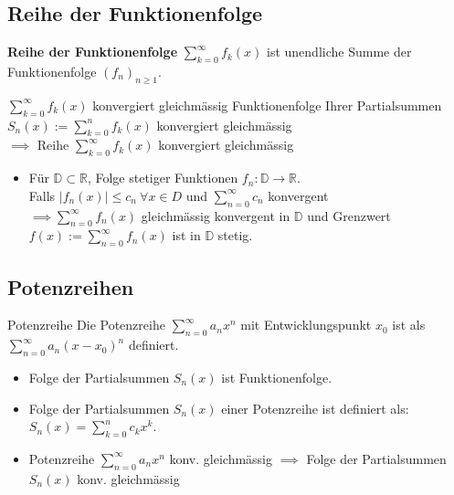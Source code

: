 \documentclass[a4paper]{article}
\newcommand\R{\ensuremath{\mathbb{R}}}
\begin{document}
\subsection{Reihe der Funktionenfolge}
\textbf{Reihe der Funktionenfolge} $\sum_{k=0}^{\infty} f_k(x)$ ist unendliche Summe der Funktionenfolge $(f_n)_{n \geqslant 1}$.
\begin{mainbox}{$\sum_{k=0}^{\infty} f_k(x)$ konvergiert gleichmässig}
  Funktionenfolge Ihrer Partialsummen $S_n(x) := \sum_{k=0}^{n} f_k(x)$ konvergiert gleichmässig \\
  $\implies$ Reihe $\sum_{k=0}^{\infty} f_k(x)$ konvergiert gleichmässig
\end{mainbox}
\begin{itemize}[leftmargin=4.5mm, topsep=1pt, parsep=1pt]
  \item Für $\mathbb{D} \subset \R$, Folge stetiger Funktionen $f_n:\mathbb{D} \to \R$. \\
  Falls $\left| f_n(x) \right| \le c_n \ \forall x \in D$ und $\sum_{n=0}^{\infty} c_n$ konvergent \\
  $\implies \sum_{n=0}^{\infty} f_n(x)$ gleichmässig konvergent in $\mathbb{D}$ und Grenzwert $f(x) := \sum_{n=0}^{\infty} f_n(x)$ ist in $\mathbb{D}$ stetig.
\end{itemize}

\subsection{Potenzreihen}
\begin{subbox}{Potenzreihe}
  Die Potenzreihe $\sum_{n=0}^\infty a_n x^n$ mit Entwicklungspunkt $x_0$ ist als $\sum_{n=0}^\infty a_n(x-x_0)^n$ definiert.
\end{subbox}

\begin{itemize}[leftmargin=4.5mm, topsep=1pt, parsep=1pt]
  \item Folge der Partialsummen $S_n(x)$ ist Funktionenfolge. 
  \item Folge der Partialsummen $S_n(x)$ einer Potenzreihe ist definiert als: $S_n(x) = \sum_{k=0}^{n} c_kx^k$.
  \item Potenzreihe $\sum_{n=0}^\infty a_n x^n$ konv. gleichmässig $\implies$ Folge der Partialsummen $S_n(x)$ konv. gleichmässig
\end{itemize}
\end{document}
